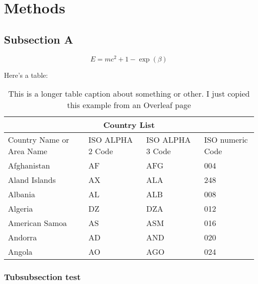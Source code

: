 \section{Methods}
\subsection{Subsection A}
\lipsum[1]
\begin{equation}
    E = mc^2 + 1 - \exp(\beta)
\end{equation}
\lipsum[2-3]

Here's a table:
\begin{table}[h!]
\centering
\caption[This is the table caption for the list]{This is a longer table caption about something or other. I just copied this example from an Overleaf page}
\begin{tabular}{ |p{3cm}||p{3cm}|p{3cm}|p{3cm}|  }
 \hline
 \multicolumn{4}{|c|}{Country List} \\
 \hline
 Country Name or Area Name& ISO ALPHA 2 Code &ISO ALPHA 3 Code&ISO numeric Code\\
 \hline
 Afghanistan   & AF    &AFG&   004\\
 Aland Islands&   AX  & ALA   &248\\
 Albania &AL & ALB&  008\\
 Algeria    &DZ & DZA&  012\\
 American Samoa&   AS  & ASM&016\\
 Andorra& AD  & AND   &020\\
 Angola& AO  & AGO&024\\
 \hline
\end{tabular}
\end{table}

\subsubsection{Tubsubsection test}
\lipsum[30-40]